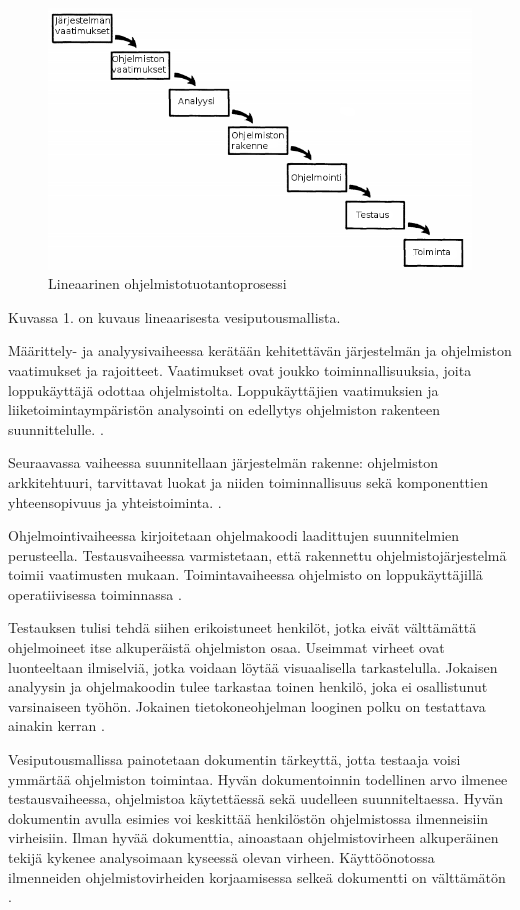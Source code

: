 \documentclass[finnish]{tktltiki2}
\theoremstyle{definition}
\theoremstyle{remark}
\begin{document}
\begin{figure}[h!]
  \caption{Lineaarinen ohjelmistotuotantoprosessi}
  \centering
    \includegraphics[width=\textwidth]{waterfall}
\end{figure}

Kuvassa 1. on kuvaus lineaarisesta vesiputousmallista.

Määrittely- ja analyysivaiheessa kerätään kehitettävän järjestelmän ja ohjelmiston vaatimukset ja rajoitteet. Vaatimukset ovat joukko toiminnallisuuksia, joita loppukäyttäjä odottaa ohjelmistolta. Loppukäyttäjien vaatimuksien ja liiketoimintaympäristön analysointi on edellytys ohjelmiston rakenteen suunnittelulle. \cite{ROY70}.

Seuraavassa vaiheessa suunnitellaan järjestelmän rakenne: ohjelmiston arkkitehtuuri, tarvittavat luokat ja niiden toiminnallisuus sekä komponenttien yhteensopivuus ja yhteistoiminta. \cite{ROY70}.

Ohjelmointivaiheessa kirjoitetaan ohjelmakoodi laadittujen suunnitelmien perusteella. Testausvaiheessa varmistetaan, että rakennettu ohjelmistojärjestelmä toimii vaatimusten mukaan. Toimintavaiheessa ohjelmisto on loppukäyttäjillä operatiivisessa toiminnassa \cite{ROY70}. 

Testauksen tulisi tehdä siihen erikoistuneet henkilöt, jotka eivät välttämättä ohjelmoineet itse alkuperäistä ohjelmiston osaa. Useimmat virheet ovat luonteeltaan ilmiselviä, jotka voidaan löytää visuaalisella tarkastelulla. Jokaisen analyysin ja ohjelmakoodin tulee tarkastaa toinen henkilö, joka ei osallistunut varsinaiseen työhön. Jokainen tietokoneohjelman looginen polku on testattava ainakin kerran \cite{ROY70}.

Vesiputousmallissa painotetaan dokumentin tärkeyttä, jotta testaaja voisi ymmärtää ohjelmiston toimintaa. Hyvän dokumentoinnin todellinen arvo ilmenee testausvaiheessa, ohjelmistoa käytettäessä sekä uudelleen suunniteltaessa. Hyvän dokumentin avulla esimies voi keskittää henkilöstön ohjelmistossa ilmenneisiin virheisiin. Ilman hyvää dokumenttia, ainoastaan ohjelmistovirheen alkuperäinen tekijä kykenee analysoimaan kyseessä olevan virheen. Käyttöönotossa ilmenneiden ohjelmistovirheiden korjaamisessa selkeä dokumentti on välttämätön \cite{ROY70}.
\end{document}
